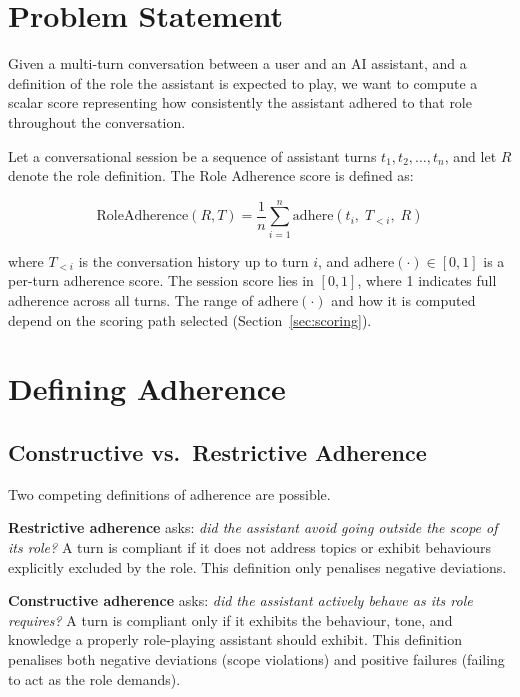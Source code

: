 \documentclass[11pt,a4paper]{article}
\begin{document}
\section{Problem Statement}

Given a multi-turn conversation between a user and an AI assistant, and a
definition of the role the assistant is expected to play, we want to compute a
scalar score representing how consistently the assistant adhered to that role
throughout the conversation.

Let a conversational session be a sequence of assistant turns
$t_1, t_2, \ldots, t_n$, and let $R$ denote the role definition. The Role
Adherence score is defined as:

\begin{equation}
  \text{RoleAdherence}(R, T) = \frac{1}{n} \sum_{i=1}^{n}
  \text{adhere}(t_i,\; T_{<i},\; R)
  \label{eq:score}
\end{equation}

where $T_{<i}$ is the conversation history up to turn $i$, and
$\text{adhere}(\cdot) \in [0, 1]$ is a per-turn adherence score. The
session score lies in $[0, 1]$, where 1 indicates full adherence across
all turns. The range of $\text{adhere}(\cdot)$ and how it is computed
depend on the scoring path selected (Section~\ref{sec:scoring}).

\section{Defining Adherence}
\label{sec:adherence}

\subsection{Constructive vs.\ Restrictive Adherence}

Two competing definitions of adherence are possible.

\textbf{Restrictive adherence} asks: \emph{did the assistant avoid going
outside the scope of its role?} A turn is compliant if it does not address
topics or exhibit behaviours explicitly excluded by the role. This definition
only penalises negative deviations.

\textbf{Constructive adherence} asks: \emph{did the assistant actively behave
as its role requires?} A turn is compliant only if it exhibits the behaviour,
tone, and knowledge a properly role-playing assistant should exhibit. This
definition penalises both negative deviations (scope violations) and positive
failures (failing to act as the role demands).
\end{document}
